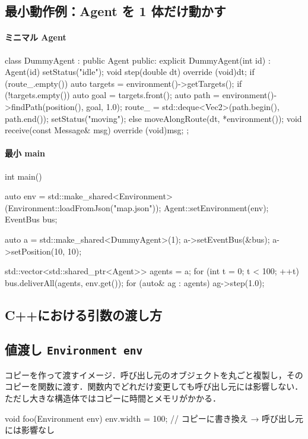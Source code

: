 \documentclass[10pt,letterpaper]{jsarticle}
\begin{document}
\subsection{最小動作例：Agent を 1 体だけ動かす}
\paragraph{ミニマル Agent}
\begin{cppcode}
class DummyAgent : public Agent {
public:
    explicit DummyAgent(int id) : Agent(id) { setStatus("idle"); }
    void step(double dt) override {
        (void)dt;
        if (route_.empty()) {
            auto targets = environment()->getTargets();
            if (!targets.empty()) {
                auto goal = targets.front();
                auto path = environment()->findPath(position(), goal, 1.0);
                route_ = std::deque<Vec2>(path.begin(), path.end());
                setStatus("moving");
            }
        } else {
            moveAlongRoute(dt, *environment());
        }
    }
    void receive(const Message& msg) override { (void)msg; }
};
\end{cppcode}

\paragraph{最小 main}
\begin{cppcode}
int main() {
    auto env = std::make_shared<Environment>(Environment::loadFromJson("map.json"));
    Agent::setEnvironment(env);
    EventBus bus;

    auto a = std::make_shared<DummyAgent>(1);
    a->setEventBus(&bus);
    a->setPosition({10, 10});

    std::vector<std::shared_ptr<Agent>> agents = {a};
    for (int t = 0; t < 100; ++t) {
        bus.deliverAll(agents, env.get());
        for (auto& ag : agents) ag->step(1.0);
    }
}
\end{cppcode}

\subsection{C++における引数の渡し方}
\subsection{値渡し \texttt{Environment env}}
コピーを作って渡すイメージ．呼び出し元のオブジェクトを丸ごと複製し，そのコピーを関数に渡す．関数内でどれだけ変更しても呼び出し元には影響しない．ただし大きな構造体ではコピーに時間とメモリがかかる．
\begin{cppcode}
void foo(Environment env) {
    env.width = 100; // コピーに書き換え → 呼び出し元には影響なし
}
\end{cppcode}
\end{document}
